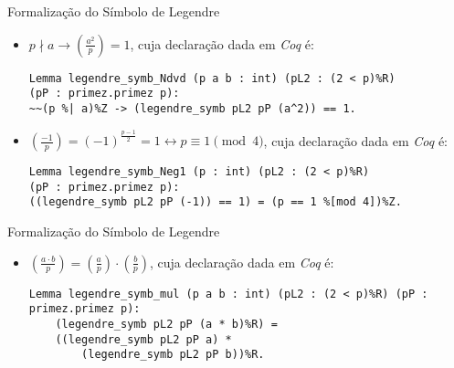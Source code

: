 \begin{frame}[fragile]{Formalização do Símbolo de Legendre}

    \begin{itemize}
        \item $p \nmid a \rightarrow \left(\frac{a^2}{p}\right) = 1$, cuja declaração dada em \textit{Coq} é:
        \newline
            \begin{lstlisting}[language=coq,frame=single,tabsize=1]
Lemma legendre_symb_Ndvd (p a b : int) (pL2 : (2 < p)%R) 
(pP : primez.primez p):
~~(p %| a)%Z -> (legendre_symb pL2 pP (a^2)) == 1.
            \end{lstlisting}

        \item $\left(\frac{-1}{p}\right) = (-1)^{\frac{p - 1}{2}} = 1 \leftrightarrow p \equiv 1 \pmod{4}$, cuja declaração dada em \textit{Coq} é:
        \newline
            \begin{lstlisting}[language=coq,frame=single,tabsize=1]
Lemma legendre_symb_Neg1 (p : int) (pL2 : (2 < p)%R) 
(pP : primez.primez p):
((legendre_symb pL2 pP (-1)) == 1) = (p == 1 %[mod 4])%Z.
            \end{lstlisting}

    \end{itemize}

\end{frame}

\begin{frame}[fragile]{Formalização do Símbolo de Legendre}

    \begin{itemize}
        \item $\left(\frac{a \cdot b}{p}\right) = \left(\frac{a}{p}\right) \cdot \left(\frac{b}{p}\right)$, cuja declaração dada em \textit{Coq} é:
        \newline
            \begin{lstlisting}[language=coq,frame=single,tabsize=1]
Lemma legendre_symb_mul (p a b : int) (pL2 : (2 < p)%R) (pP : primez.primez p):
    (legendre_symb pL2 pP (a * b)%R) = 
    ((legendre_symb pL2 pP a) * 
        (legendre_symb pL2 pP b))%R.
            \end{lstlisting}
    \end{itemize}

\end{frame}